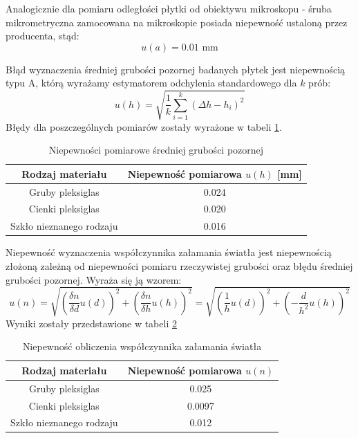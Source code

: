 \documentclass[a4paper,12pts]{article}
\begin{document}
	Analogicznie dla pomiaru odległości płytki od obiektywu mikroskopu - śruba mikrometryczna zamocowana na mikroskopie posiada niepewność ustaloną przez producenta, stąd:
	\begin{equation}
		u(a) = 0.01 \textrm{ mm}
	\end{equation}
	
	Błąd wyznaczenia średniej grubości pozornej badanych płytek jest niepewnością typu A, którą wyrażamy estymatorem odchylenia standardowego dla $k$ prób:
	\begin{equation}
		u(h) = \sqrt{\frac{1}{k}\sum_{i=1}^{k}(\Delta h - h_i)^2}
	\end{equation}
	Błędy dla poszczególnych pomiarów zostały wyrażone w tabeli \ref{niepewność_h}.
	\begin{table}[!h]
		\centering
		\begin{tabular}{|c|c|}
			\hline
			Rodzaj materiału  &  Niepewność pomiarowa $u(h)$ [mm] \\ \hline
			Gruby pleksiglas   &  0.024 \\ \hline
			Cienki pleksiglas  &  0.020 \\ \hline
			Szkło nieznanego rodzaju & 0.016 \\ \hline
		\end{tabular}
		\caption{Niepewności pomiarowe średniej grubości pozornej}
		\label{niepewność_h}
	\end{table}

	Niepewność wyznaczenia współczynnika załamania światła jest niepewnością złożoną zależną od niepewności pomiaru rzeczywistej grubości oraz błędu średniej grubości pozornej. Wyraża się ją wzorem:
	\begin{equation}
		u(n) = \sqrt{\left(\frac{\delta n }{\delta d} u(d) \right)^2 + \left(\frac{\delta n}{\delta h} u(h)\right)^2} = \sqrt{\left(\frac{1}{h}u(d)\right)^2 + \left(-\frac{d}{h^2}u(h)\right)^2}
	\end{equation}
	Wyniki zostały przedstawione w tabeli \ref{niepewność_n}
	\begin{table}[!h]
		\centering
		\begin{tabular}{|c|c|}
			\hline
			Rodzaj materiału & Niepewność pomiarowa $u(n)$ \\ \hline
			Gruby pleksiglas & 0.025 \\ \hline
			Cienki pleksiglas & 0.0097 \\ \hline
			Szkło nieznanego rodzaju & 0.012 \\ \hline
		\end{tabular}
		\caption{Niepewność obliczenia współczynnika załamania światła}
		\label{niepewność_n}
	\end{table}
\end{document}
